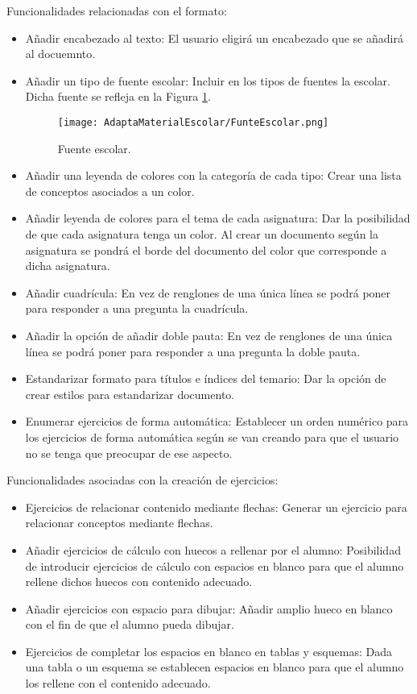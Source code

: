 Funcionalidades relacionadas con el formato: 
\begin{itemize}
  \item Añadir encabezado al texto: El usuario eligirá un encabezado que se añadirá al docuemnto.
  \item Añadir un tipo de fuente escolar: Incluir en los tipos de fuentes la escolar. Dicha fuente se refleja en la Figura \ref{escolar}.
  \begin{figure}[ht!]
    \centering
    \texttt{[image: AdaptaMaterialEscolar/FunteEscolar.png]}
    \caption{Fuente escolar.}
    \label{escolar}
\end{figure}
  \item Añadir una leyenda de colores con la categoría de cada tipo: Crear una lista de conceptos asociados a un color.
  \item Añadir leyenda de colores para el tema de cada asignatura: Dar la posibilidad de que cada asignatura tenga un color. Al crear un documento según la asignatura se pondrá el borde del documento del color que corresponde a dicha asignatura.
  \item Añadir cuadrícula: En vez de renglones de una única línea se podrá poner para responder a una pregunta la cuadrícula.
  \item Añadir la opción de añadir doble pauta: En vez de renglones de una única línea se podrá poner para responder a una pregunta la doble pauta.
  \item Estandarizar formato para títulos e índices del temario: Dar la opción de crear estilos para estandarizar documento.
  \item Enumerar ejercicios de forma automática: Establecer un orden numérico para los ejercicios de forma automática según se van creando para que el usuario no se tenga que preocupar de ese aspecto.
\end{itemize}
Funcionalidades asociadas con la creación de ejercicios:
\begin{itemize}
  \item Ejercicios de relacionar contenido mediante flechas: Generar un ejercicio para relacionar conceptos mediante flechas.
  \item Añadir ejercicios de cálculo con huecos a rellenar por el alumno: Posibilidad de introducir ejercicios de cálculo con espacios en blanco para que el alumno rellene dichos huecos con contenido adecuado.
  \item Añadir ejercicios con espacio para dibujar: Añadir amplio hueco en blanco con el fin de que el alumno pueda dibujar.
  \item Ejercicios de completar los espacios en blanco en tablas y esquemas: Dada una tabla o un esquema se establecen espacios en blanco para que el alumno los rellene con el contenido adecuado.
\end{itemize}
